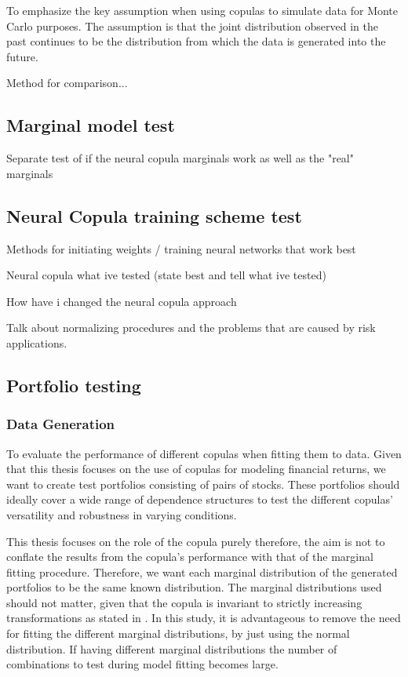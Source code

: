 To emphasize the key assumption when using copulas to simulate data for Monte Carlo purposes. The assumption is that the joint distribution observed in the past continues to be the distribution from which the data is generated into the future. 

Method for comparison...




\subsection{Marginal model test}
Separate test of if the neural copula marginals work as well as the "real" marginals


\subsection{Neural Copula training scheme test}
Methods for initiating weights / training neural networks that work best

Neural copula what ive tested (state best and tell what ive tested)

How have i changed the neural copula approach 

\begin{generalinstructions}
    Talk about normalizing procedures and the problems that are caused by risk applications. 
\end{generalinstructions}




\subsection{Portfolio testing}

\subsubsection{Data Generation}
To evaluate the performance of different copulas when fitting them to data. Given that this thesis focuses on the use of copulas for modeling financial returns, we want to create test portfolios consisting of pairs of stocks. These portfolios should ideally cover a wide range of dependence structures to test the different copulas' versatility and robustness in varying conditions. 

This thesis focuses on the role of the copula purely therefore, the aim is not to conflate the results from the copula's performance with that of the marginal fitting procedure. Therefore, we want each marginal distribution of the generated portfolios to be the same known distribution. The marginal distributions used should not matter, given that the copula is invariant to strictly increasing transformations as stated in  . In this study, it is advantageous to remove the need for fitting the different marginal distributions, by just using the normal distribution. If having different marginal distributions the number of combinations to test during model fitting becomes large.  


